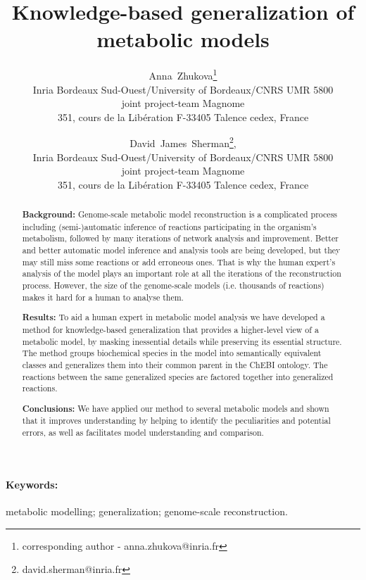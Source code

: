 \documentclass[9pt]{article}
\title{Knowledge-based generalization of metabolic models}
\author{Anna~Zhukova\thanks{corresponding author - anna.zhukova@inria.fr}\\ Inria Bordeaux Sud-Ouest/University of Bordeaux/CNRS UMR 5800\\
joint project-team Magnome\\
351, cours de la Lib\'{e}ration F-33405 Talence cedex, France
        \and David~James~Sherman\thanks{david.sherman@inria.fr}, \\ Inria Bordeaux Sud-Ouest/University of Bordeaux/CNRS UMR 5800\\
        joint project-team Magnome\\
351, cours de la Lib\'{e}ration F-33405 Talence cedex, France}
\date{}
\begin{document}
\maketitle
\newpage

\begin{abstract}
{\bf Background:} Genome-scale metabolic model reconstruction is a complicated process including (semi-)automatic inference of reactions participating in the organism's metabolism, followed by many iterations of network analysis and improvement. Better and better automatic model inference and analysis tools are being developed, but they may still miss some reactions or add erroneous ones. That is why the human expert's analysis of the model plays an important role at all the iterations of the reconstruction process. However, the size of the genome-scale models (i.e. thousands of reactions) makes it hard for a human to analyse them.

{\bf Results:} To aid a human expert in metabolic model analysis we have developed a method for knowledge-based generalization that provides a higher-level view of a metabolic model, by masking inessential details while preserving its essential structure. The method groups biochemical species in the model into semantically equivalent classes and generalizes them into their common parent in the ChEBI ontology. The reactions between the same generalized species are factored together into generalized reactions.

{\bf Conclusions:} We have applied our method to several metabolic models and shown that it improves understanding by helping to identify the peculiarities and potential errors, as well as facilitates model understanding and comparison.      
\end{abstract}

\paragraph*{Keywords:}metabolic modelling; generalization; genome-scale reconstruction.

\newpage
\end{document}
